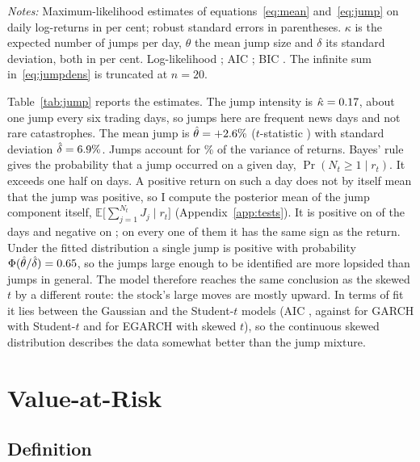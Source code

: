 \documentclass[11pt,a4paper]{article}
\newcommand{\E}{\mathbb{E}}
\newcommand{\tabnote}[1]{\par\vspace{5pt}\begin{minipage}{\linewidth}\setstretch{1.0}\footnotesize\textit{Notes:} #1\end{minipage}}
\begin{document}
\begin{table}[t]
\centering
\caption{AR(1)--GARCH model with Poisson jumps}\label{tab:jump}
\small

\tabnote{Maximum-likelihood estimates of equations~\eqref{eq:mean} and~\eqref{eq:jump} on daily log-returns in per cent; robust standard errors in parentheses. $\kappa$ is the expected number of jumps per day, $\theta$ the mean jump size and $\delta$ its standard deviation, both in per cent. Log-likelihood \jumpLL; AIC \jumpAIC; BIC \jumpBIC. The infinite sum in~\eqref{eq:jumpdens} is truncated at $n=20$.}
\end{table}

Table~\ref{tab:jump} reports the estimates. The jump intensity is $\hat\kappa=0.17$, about one jump every six trading days, so jumps here are frequent news days and not rare catastrophes. The mean jump is $\hat\theta=+2.6\%$ ($t$-statistic \jumpThetaT) with standard deviation $\hat\delta=6.9\%$. Jumps account for \jumpShare\% of the variance of returns. Bayes' rule gives the probability that a jump occurred on a given day, $\Pr(N_t\ge1\mid r_t)$. It exceeds one half on \jumpN{} days. A positive return on such a day does not by itself mean that the jump was positive, so I compute the posterior mean of the jump component itself, $\E\bigl[\sum_{j=1}^{N_t}J_j\mid r_t\bigr]$ (Appendix~\ref{app:tests}). It is positive on \jumpUp{} of the \jumpN{} days and negative on \jumpDown{}; on every one of them it has the same sign as the return. Under the fitted distribution a single jump is positive with probability $\Phi(\hat\theta/\hat\delta)=0.65$, so the jumps large enough to be identified are more lopsided than jumps in general. The model therefore reaches the same conclusion as the skewed $t$ by a different route: the stock's large moves are mostly upward. In terms of fit it lies between the Gaussian and the Student-$t$ models (AIC \jumpAIC, against \gtAIC{} for GARCH with Student-$t$ and \esAIC{} for EGARCH with skewed $t$), so the continuous skewed distribution describes the data somewhat better than the jump mixture.

\section{Value-at-Risk}\label{sec:var}

\subsection{Definition}
\end{document}
